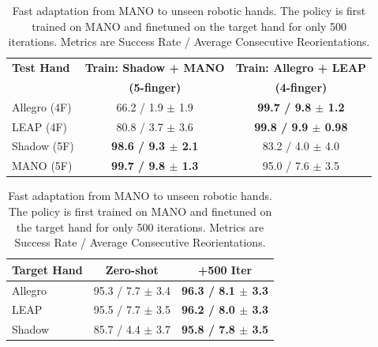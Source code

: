 \begin{table}[t]
\centering

\begin{minipage}[t]{0.48\textwidth}
\centering
\caption{
Cross-morphology generalization across robotic hands with different numbers of fingers. 
Metrics are reported as (Success Rate / Average Consecutive Reorientations).
}
\label{tab:finger_generalization}

\scriptsize
\setlength{\tabcolsep}{3pt}

\begin{tabular}{lcc}
\toprule
\textbf{Test Hand} 
& \textbf{Train: Shadow + MANO} 
& \textbf{Train: Allegro + LEAP} \\
& \textbf{(5-finger)} 
& \textbf{(4-finger)} \\
\midrule

Allegro (4F) 
& 66.2 / 1.9 $\pm$ 1.9
& \textbf{99.7 / 9.8 $\pm$ 1.2}  \\

LEAP (4F) 
& 80.8 / 3.7 $\pm$ 3.6
& \textbf{99.8 / 9.9 $\pm$ 0.98} \\

Shadow (5F) 
& \textbf{98.6 / 9.3 $\pm$ 2.1} 
& 83.2 / 4.0 $\pm$ 4.0 \\

MANO (5F) 
& \textbf{99.7 / 9.8 $\pm$ 1.3} 
& 95.0 / 7.6 $\pm$ 3.5\\

\bottomrule
\end{tabular}
\end{minipage}
\hfill
\begin{minipage}[t]{0.48\textwidth}
\centering
\caption{
Fast adaptation from MANO to unseen robotic hands. 
The policy is first trained on MANO and finetuned on the target hand for only 500 iterations. 
Metrics are Success Rate / Average Consecutive Reorientations.
}
\label{tab:finetuning}

\scriptsize
\setlength{\tabcolsep}{10pt}

\begin{tabular}{lcc}
\toprule
\textbf{Target Hand} 
& \textbf{Zero-shot} 
& \textbf{+500 Iter} \\
\midrule

Allegro 
& 95.3 / 7.7 $\pm$ 3.4
& \textbf{96.3 / 8.1 $\pm$ 3.3} \\

LEAP 
& 95.5 / 7.7 $\pm$ 3.5
& \textbf{96.2 / 8.0 $\pm$ 3.3} \\

Shadow 
& 85.7 / 4.4 $\pm$ 3.7
& \textbf{95.8 / 7.8 $\pm$ 3.5} \\

\bottomrule
\end{tabular}
\end{minipage}
\vspace{-4mm}
\end{table}




